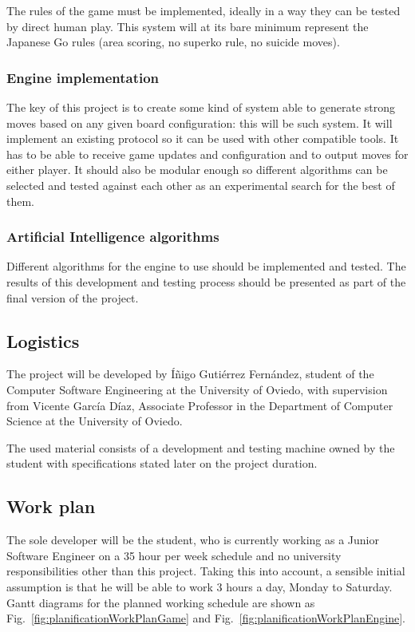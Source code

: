 The rules of the game must be implemented, ideally in a way they can be tested
by direct human play. This system will at its bare minimum represent the
Japanese Go rules (area scoring, no superko rule, no suicide moves).

\subsubsection{Engine implementation}

The key of this project is to create some kind of system able to generate strong
moves based on any given board configuration: this will be such system. It will
implement an existing protocol so it can be used with other compatible tools. It
has to be able to receive game updates and configuration and to output moves for
either player. It should also be modular enough so different algorithms can be
selected and tested against each other as an experimental search for the best of
them.

\subsubsection{Artificial Intelligence algorithms}

Different algorithms for the engine to use should be implemented and tested. The
results of this development and testing process should be presented as part of
the final version of the project.

\subsection{Logistics}

The project will be developed by Íñigo Gutiérrez Fernández, student of the
Computer Software Engineering at the University of Oviedo, with supervision from
Vicente García Díaz, Associate Professor in the Department of Computer Science
at the University of Oviedo.

The used material consists of a development and testing machine owned by the
student with specifications stated later on the project duration.

\subsection{Work plan}

The sole developer will be the student, who is currently working as a Junior
Software Engineer on a 35 hour per week schedule and no university
responsibilities other than this project. Taking this into account, a sensible
initial assumption is that he will be able to work 3 hours a day, Monday to
Saturday. Gantt diagrams for the planned working schedule are shown as
Fig.~\ref{fig:planificationWorkPlanGame} and
Fig.~\ref{fig:planificationWorkPlanEngine}.

